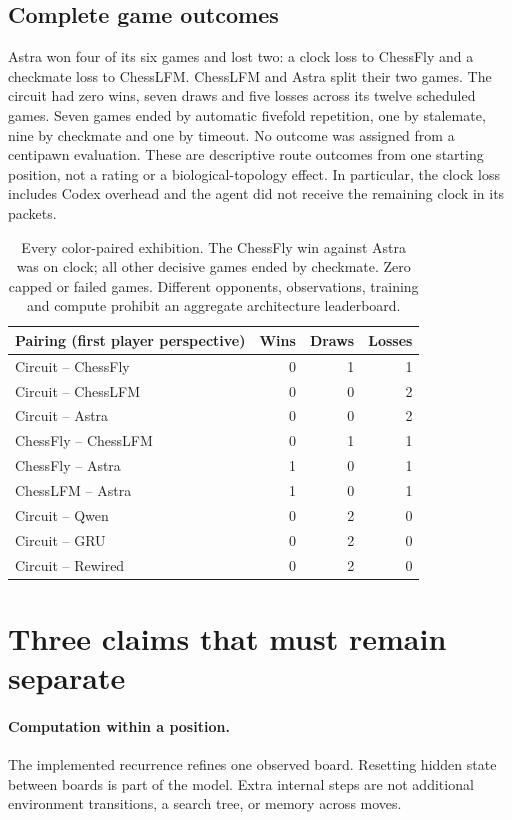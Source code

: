\documentclass[10pt]{article}
\begin{document}
\subsection{Complete game outcomes}
Astra won four of its six games and lost two: a clock loss to ChessFly and a
checkmate loss to ChessLFM. ChessLFM and Astra split their two games. The circuit
had zero wins, seven draws and five losses across its twelve scheduled games.
Seven games ended by automatic fivefold repetition, one by stalemate, nine by
checkmate and one by timeout. No outcome was assigned from a centipawn evaluation.
These are descriptive route outcomes from one starting position, not a rating
or a biological-topology effect. In particular, the clock loss includes Codex
overhead and the agent did not receive the remaining clock in its packets.

\begin{table}[t]
\centering
\begin{tabular}{lrrr}
\toprule
Pairing (first player perspective) & Wins & Draws & Losses\\
\midrule
Circuit -- ChessFly & 0 & 1 & 1\\
Circuit -- ChessLFM & 0 & 0 & 2\\
Circuit -- Astra & 0 & 0 & 2\\
ChessFly -- ChessLFM & 0 & 1 & 1\\
ChessFly -- Astra & 1 & 0 & 1\\
ChessLFM -- Astra & 1 & 0 & 1\\
Circuit -- Qwen & 0 & 2 & 0\\
Circuit -- GRU & 0 & 2 & 0\\
Circuit -- Rewired & 0 & 2 & 0\\
\bottomrule
\end{tabular}
\caption{Every color-paired exhibition. The ChessFly win against Astra was on
clock; all other decisive games ended by checkmate. Zero capped or failed games.
Different opponents, observations, training and compute prohibit an aggregate
architecture leaderboard.}
\label{tab:games}
\end{table}

\section{Three claims that must remain separate}
\paragraph{Computation within a position.}
The implemented recurrence refines one observed board. Resetting hidden state
between boards is part of the model. Extra internal steps are not additional
environment transitions, a search tree, or memory across moves.
\end{document}
